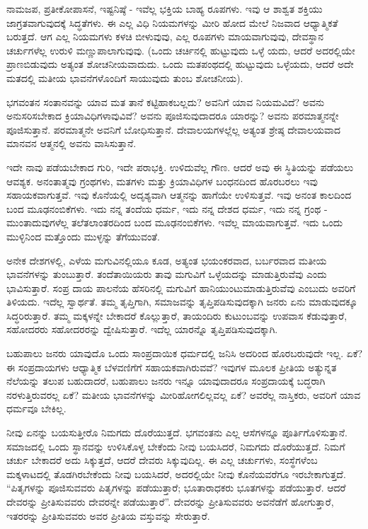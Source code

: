 ನಾಮಜಪ, ಪ್ರತೀಕೋಪಾಸನೆ, ಇಷ್ಟನಿಷ್ಠೆ - ಇವೆಲ್ಲ ಭಕ್ತಿಯ ಬಾಹ್ಯ ರೂಪಗಳು. ಇವು ಆ ಶಾಶ್ವತ ಶಕ್ತಿಯು ಜಾಗ್ರತವಾಗುವುದಕ್ಕೆ ಸಿದ್ಧತೆಗಳು. ಈ ಎಲ್ಲ ವಿಧಿ ನಿಯಮಗಳನ್ನು ಮೀರಿ ಹೋದ ಮೇಲೆ ನಿಜವಾದ ಆಧ್ಯಾತ್ಮಿಕತೆ ಬರುತ್ತದೆ. ಆಗ ಎಲ್ಲ ನಿಯಮಗಳು ಕಳಚಿ ಬೀಳುವುವು, ಎಲ್ಲ ರೂಪಗಳು ಮಾಯವಾಗುವುವು, ದೇವಸ್ಥಾನ ಚರ್ಚುಗಳೆಲ್ಲ ಉರುಳಿ ಮಣ್ಣುಪಾಲಾಗುವುವು. (ಒಂದು ಚರ್ಚಿನಲ್ಲಿ ಹುಟ್ಟುವುದು ಒಳ್ಳೆ ಯದು, ಆದರೆ ಅದರಲ್ಲಿಯೇ ಪ್ರಾಣಬಿಡುವುದು ಅತ್ಯಂತ ಶೋಚನೀಯವಾದುದು. ಒಂದು ಮತಪಂಥದಲ್ಲಿ ಹುಟ್ಟುವುದು ಒಳ್ಳೆಯದು, ಆದರೆ ಅದೇ ಮತದಲ್ಲಿ ಮತೀಯ ಭಾವನೆಗಳೊಂದಿಗೆ ಸಾಯುವುದು ತುಂಬ ಶೋಚನೀಯ).

ಭಗವಂತನ ಸಂತಾನವನ್ನು ಯಾವ ಮತ ತಾನೆ ಕಟ್ಟಿಹಾಕಬಲ್ಲದು? ಅವನಿಗೆ ಯಾವ ನಿಯಮವಿದೆ? ಅವನು ಅನುಸರಿಸಬೇಕಾದ ಕ್ರಿಯಾವಿಧಿಗಳಾವುವಿವೆ? ಅವನು ಪೂಜಿಸುವುದಾದರೂ ಯಾರನ್ನು? ಅವನು ಪರಮಾತ್ಮನನ್ನೇ ಪೂಜಿಸುತ್ತಾನೆ. ಪರಮಾತ್ಮನೇ ಅವನಿಗೆ ಬೋಧಿಸುತ್ತಾನೆ. ದೇವಾಲಯಗಳಲ್ಲೆಲ್ಲ ಅತ್ಯಂತ ಶ್ರೇಷ್ಠ ದೇವಾಲಯವಾದ ಮಾನವನ ಆತ್ಮನಲ್ಲಿ ಅವನು ವಾಸಿಸುತ್ತಾನೆ.

ಇದೇ ನಾವು ಪಡೆಯಬೇಕಾದ ಗುರಿ, ಇದೇ ಪರಾಭಕ್ತಿ. ಉಳಿದುವೆಲ್ಲ ಗೌಣ. ಆದರೆ ಅವು ಈ ಸ್ಥಿತಿಯನ್ನು ಪಡೆಯಲು ಆವಶ್ಯಕ. ಅನಂತಾತ್ಮವು ಗ್ರಂಥಗಳು, ಮತಗಳು ಮತ್ತು ಕ್ರಿಯಾವಿಧಿಗಳ ಬಂಧನದಿಂದ ಹೊರಬರಲು ಇವು ಸಹಾಯಕವಾಗುತ್ತವೆ. ಇವು ಕೊನೆಯಲ್ಲಿ ಅದೃಶ್ಯವಾಗಿ ಆತ್ಮನನ್ನು ಹಾಗೆಯೇ ಉಳಿಸುತ್ತವೆ. ಇವು ಅನಂತ ಕಾಲದಿಂದ ಬಂದ ಮೂಢನಂಬಿಕೆಗಳು. ಇದು ನನ್ನ ತಂದೆಯ ಧರ್ಮ, ಇದು ನನ್ನ ದೇಶದ ಧರ್ಮ, ಇದು ನನ್ನ ಗ್ರಂಥ - ಮುಂತಾದುವುಗಳೆಲ್ಲ ತಲೆತಲಾಂತರದಿಂದ ಬಂದ ಮೂಢನಂಬಿಕೆಗಳು. ಇವೆಲ್ಲ ಮಾಯವಾಗುತ್ತವೆ. ಇದು ಒಂದು ಮುಳ್ಳಿನಿಂದ ಮತ್ತೊಂದು ಮುಳ್ಳನ್ನು ತೆಗೆಯುವಂತೆ.

ಅನೇಕ ದೇಶಗಳಲ್ಲಿ, ಎಳೆಯ ಮಗುವಿನಲ್ಲಿಯೂ ಕೂಡ, ಅತ್ಯಂತ ಭಯಂಕರವಾದ, ಬರ್ಬರವಾದ ಮತೀಯ ಭಾವನೆಗಳನ್ನು ತುಂಬುತ್ತಾರೆ. ತಂದೆತಾಯಿಯರು ತಾವು ಮಗುವಿಗೆ ಒಳ್ಳೆಯದನ್ನು ಮಾಡುತ್ತಿರುವೆವು ಎಂದು ಭಾವಿಸುತ್ತಾರೆ. ಸಂಪ್ರ ದಾಯ ಪಾಲನೆಯ ಹೆಸರಿನಲ್ಲಿ ಮಗುವಿಗೆ ಹಾನಿಯುಂಟುಮಾಡುತ್ತಿರುವೆವು ಎಂಬುದು ಅವರಿಗೆ ತಿಳಿಯದು. ಇದೆಲ್ಲ ಸ್ವಾರ್ಥತೆ. ತಮ್ಮ ತೃಪ್ತಿಗಾಗಿ, ಸಮಾಜವನ್ನು ತೃಪ್ತಿಪಡಿಸುವುದಕ್ಕಾಗಿ ಜನರು ಏನು ಮಾಡುವುದಕ್ಕೂ ಸಿದ್ಧರಿರುತ್ತಾರೆ. ತಮ್ಮ ಮಕ್ಕಳನ್ನೇ ಬೇಕಾದರೆ ಕೊಲ್ಲುತ್ತಾರೆ, ತಾಯಂದಿರು ಕುಟುಂಬವನ್ನು ಉಪವಾಸ ಕೆಡುವುತ್ತಾರೆ, ಸಹೋದರರು ಸಹೋದರರನ್ನು ದ್ವೇಷಿಸುತ್ತಾರೆ. ಇದೆಲ್ಲ ಯಾರನ್ನೊ ತೃಪ್ತಿಪಡಿಸುವುದಕ್ಕಾಗಿ.

ಬಹುಪಾಲು ಜನರು ಯಾವುದೊ ಒಂದು ಸಾಂಪ್ರದಾಯಿಕ ಧರ್ಮದಲ್ಲಿ ಜನಿಸಿ ಅದರಿಂದ ಹೊರಬರುವುದೇ ಇಲ್ಲ. ಏಕೆ? ಈ ಸಂಪ್ರದಾಯಗಳು ಆಧ್ಯಾತ್ಮಿಕ ಬೆಳವಣಿಗೆಗೆ ಸಹಾಯಕವಾಗಿರುವವೆ? ಇವುಗಳ ಮೂಲಕ ಪ್ರೀತಿಯ ಅತ್ಯುನ್ನತ ನೆಲೆಯನ್ನು ತಲುಪ ಬಹುದಾದರೆ, ಬಹುಪಾಲು ಜನರು ಇನ್ನೂ ಯಾವುದಾದರೂ ಸಂಪ್ರದಾಯಕ್ಕೆ ಬದ್ಧರಾಗಿ ನರಳುತ್ತಿರುವರಲ್ಲ ಏಕೆ? ಮತೀಯ ಭಾವನೆಗಳನ್ನು ಮೀರಿಹೋಗಲಿಲ್ಲವಲ್ಲ ಏಕೆ? ಅವರೆಲ್ಲ ನಾಸ್ತಿಕರು, ಅವರಿಗೆ ಯಾವ ಧರ್ಮವೂ ಬೇಕಿಲ್ಲ.

ನೀವು ಏನನ್ನು ಬಯಸುತ್ತೀರೊ ನಿಮಗದು ದೊರೆಯುತ್ತದೆ. ಭಗವಂತನು ಎಲ್ಲ ಆಸೆಗಳನ್ನೂ ಪೂರ್ತಿಗೊಳಿಸುತ್ತಾನೆ. ಸಮಾಜದಲ್ಲಿ ಒಂದು ಸ್ಥಾನವನ್ನು ಉಳಿಸಿಕೊಳ್ಳ ಬೇಕೆಂದು ನೀವು ಬಯಸಿದರೆ, ನಿಮಗದು ದೊರೆಯುತ್ತದೆ. ನಿಮಗೆ ಚರ್ಚು ಬೇಕಾದರೆ ಅದು ಸಿಕ್ಕುತ್ತದೆ, ಆದರೆ ದೇವರು ಸಿಕ್ಕುವುದಿಲ್ಲ. ಈ ಎಲ್ಲ ಚರ್ಚುಗಳು, ಸಂಸ್ಥೆಗಳೆಂಬ ಮಕ್ಕಳಾಟದಲ್ಲಿ ತೊಡಗಿರಬೇಕೆಂದು ನೀವು ಬಯಸಿದರೆ, ಅದರಲ್ಲಿಯೇ ನೀವು ಕೊನೆಯವರೆಗೂ ಇರಬೇಕಾಗುತ್ತದೆ. “ಪಿತೃಗಳನ್ನು ಪೂಜಿಸುವವರು ಪಿತೃಗಳನ್ನು ಪಡೆಯುತ್ತಾರೆ; ಭೂತಾರಾಧಕರು ಭೂತಗಳನ್ನು ಪಡೆಯುತ್ತಾರೆ. ಆದರೆ ದೇವರನ್ನು ಪ್ರೀತಿಸುವವರು ದೇವರನ್ನೇ ಪಡೆಯುತ್ತಾರೆ”. ದೇವರನ್ನು ಪ್ರೀತಿಸುವವರು ಅವನೆಡೆಗೆ ಹೋಗುತ್ತಾರೆ, ಇತರರನ್ನು ಪ್ರೀತಿಸುವವರು ಅವರ ಪ್ರೀತಿಯ ವಸ್ತುವನ್ನು ಸೇರುತ್ತಾರೆ.

